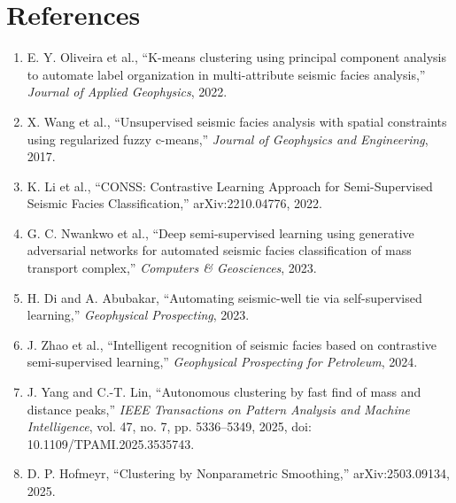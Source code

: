\documentclass[11pt,a4paper]{article}
\begin{document}
\section*{References}
\begin{enumerate}[leftmargin=1.5em]
    \item E. Y. Oliveira et al., ``K-means clustering using principal component analysis to automate label organization in multi-attribute seismic facies analysis,'' \emph{Journal of Applied Geophysics}, 2022.
    \item X. Wang et al., ``Unsupervised seismic facies analysis with spatial constraints using regularized fuzzy c-means,'' \emph{Journal of Geophysics and Engineering}, 2017.
    \item K. Li et al., ``CONSS: Contrastive Learning Approach for Semi-Supervised Seismic Facies Classification,'' arXiv:2210.04776, 2022.
    \item G. C. Nwankwo et al., ``Deep semi-supervised learning using generative adversarial networks for automated seismic facies classification of mass transport complex,'' \emph{Computers \& Geosciences}, 2023.
    \item H. Di and A. Abubakar, ``Automating seismic-well tie via self-supervised learning,'' \emph{Geophysical Prospecting}, 2023.
    \item J. Zhao et al., ``Intelligent recognition of seismic facies based on contrastive semi-supervised learning,'' \emph{Geophysical Prospecting for Petroleum}, 2024.
    \item J. Yang and C.-T. Lin, ``Autonomous clustering by fast find of mass and distance peaks,'' \emph{IEEE Transactions on Pattern Analysis and Machine Intelligence}, vol. 47, no. 7, pp. 5336--5349, 2025, doi: 10.1109/TPAMI.2025.3535743.
    \item D. P. Hofmeyr, ``Clustering by Nonparametric Smoothing,'' arXiv:2503.09134, 2025.
\end{enumerate}
\end{document}
